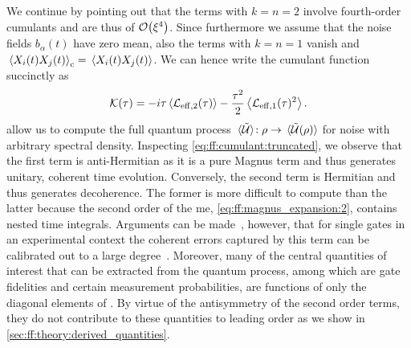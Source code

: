 We continue by pointing out that the terms with $k = n = 2$ involve fourth-order cumulants and are thus of $\order{\xi^4}$.
Since furthermore we assume that the noise fields $b_\alpha(t)$ have zero mean, also the terms with $k = n = 1$ vanish and $\ev*{X_i(t)X_j(t)}_\mr{c}  =  \ev*{X_i(t)X_j(t)}$.
We can hence write the cumulant function succinctly as
\begin{equation}
    \cumulantfun(\tau) = - \i\tau\ev{\Li_{\mr{eff},2}(\tau)} - \frac{\tau^2}{2}\ev{\Li_{\mr{eff},1}(\tau)^2}  \label{eq:ff:cumulant:truncated}.
\end{equation}
 allow us to compute the full quantum process $\liouvUeavg\!: \rho\rightarrow\ev*{\liouvUe(\rho)}$ for noise with arbitrary spectral density.
Inspecting \cref{eq:ff:cumulant:truncated}, we observe that the first term is anti-Hermitian as it is a pure Magnus term
and thus generates unitary, coherent time evolution.
Conversely, the second term is Hermitian and thus generates decoherence.
The former is more difficult to compute than the latter because the second order of the \gls{me}, \cref{eq:ff:magnus_expansion:2}, contains nested time integrals.
Arguments can be made~\cite{Cerfontaine2021}, however, that for single gates in an experimental context the coherent errors captured by this term can be calibrated out to a large degree~\cite{Cerfontaine2020a,Kimmel2015}.
Moreover, many of the central quantities of interest that can be extracted from the quantum process, among which are gate fidelities and certain measurement probabilities, are functions of only the diagonal elements of \cumulantfun.
By virtue of the antisymmetry of the second order terms, they do not contribute to these quantities to leading order as we show in \cref{sec:ff:theory:derived_quantities}.

